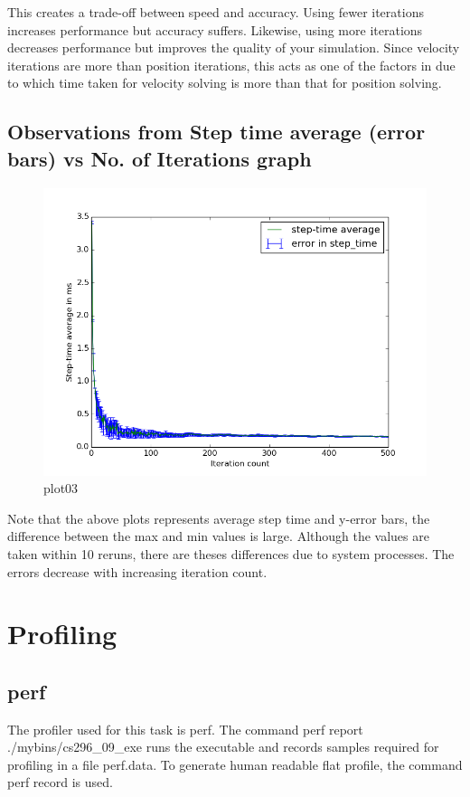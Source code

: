 \documentclass[pdftex,12pt,a4paper]{article}
\begin{document}
\par{This creates a trade-off between speed and accuracy. Using fewer iterations increases performance but accuracy suffers. Likewise, using more iterations decreases performance but improves the quality of your simulation. Since velocity iterations are more than position iterations, this acts as one of the factors in due to which time taken for velocity solving is more than that for position solving.}

\subsection{Observations from Step time average (error bars) vs No. of Iterations graph}
\begin{figure}[h!]
\centering
\includegraphics[scale=.60]{../images/plot03.png}
\caption{plot03}
\end{figure}
\indent 
\par{Note that the above plots represents average step time and y-error bars, the difference between the max and min values is large. Although the values are taken within 10 reruns, there are theses differences due to system processes. The errors decrease with increasing iteration count.}


\section{Profiling}

\subsection{perf}
\par{The profiler used for this task is perf\cite{perf}. The command perf report ./mybins/cs296\_09\_exe runs the executable and records samples required for profiling in a file perf.data. To generate human readable flat profile, the command perf record is used.}
\end{document}
